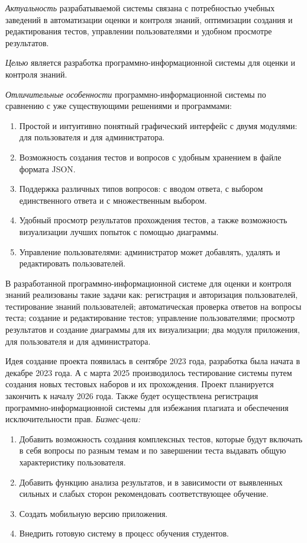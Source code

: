 \textit{Актуальность} разрабатываемой системы связана с потребностью учебных заведений в автоматизации оценки и контроля знаний, оптимизации создания и редактирования тестов, управлении пользователями и удобном просмотре результатов.

\textit{Целью} является разработка программно-информационной системы для оценки и контроля знаний. 


\textit{Отличительные особенности} программно-информационной системы по сравнению с уже существующими решениями и программами:
\begin{enumerate}
	\item Простой и интуитивно понятный графический интерфейс с двумя модулями: для пользователя и для администратора.
	\item Возможность создания тестов и вопросов с удобным хранением в файле формата JSON.
	\item Поддержка различных типов вопросов: с вводом ответа, с выбором единственного ответа и с множественным выбором.
	\item Удобный просмотр результатов прохождения тестов, а также возможность визуализации лучших попыток с помощью диаграммы.
	\item Управление пользователями: администратор может добавлять, удалять и редактировать пользователей.
\end{enumerate}


В разработанной программно-информационной системе для оценки и контроля знаний реализованы такие задачи как: регистрация и авторизация пользователей, тестирование знаний пользователей; автоматическая проверка ответов на вопросы теста; создание и редактирование тестов; управление пользователями; просмотр результатов и создание диаграммы для их визуализации; два модуля приложения, для пользователя и для администратора.

Идея создание проекта появилась в сентябре 2023 года, разработка была начата в декабре 2023 года. А с марта 2025 производилось тестирование системы путем создания новых тестовых наборов и их прохождения. Проект планируется закончить к началу 2026 года. Также будет осуществлена регистрация программно-информационной системы для избежания плагиата и обеспечения исключительности прав.
\newpage
\textit{Бизнес-цели:}
 \begin{enumerate}
 	\item Добавить возможность создания комплексных тестов, которые будут включать в себя вопросы по разным темам и по завершении теста выдавать общую характеристику пользователя.
 	\item Добавить функцию анализа результатов, и в зависимости от выявленных сильных и слабых сторон рекомендовать соответствующее обучение.
 	\item Создать мобильную версию приложения.
 	\item Внедрить готовую систему в процесс обучения студентов.
 \end{enumerate}


